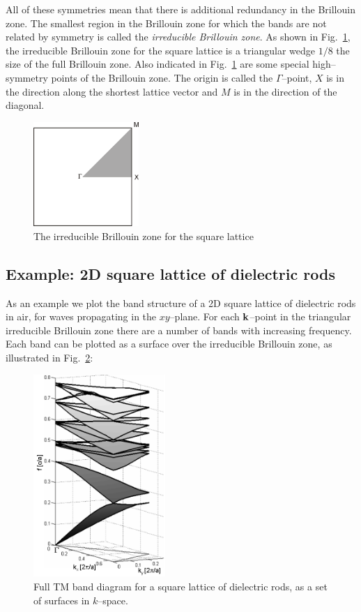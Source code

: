 All of these symmetries mean that there is additional redundancy in the Brillouin zone. The smallest region in the Brillouin zone for which the bands are not related by symmetry is called the \emph{irreducible Brillouin zone}. As shown in Fig.~\ref{fig-irred-bril}, the irreducible Brillouin zone for the square lattice is a triangular wedge $1/8$ the size of the full Brillouin zone. Also indicated in Fig.~\ref{fig-irred-bril} are some special high--symmetry points of the Brillouin zone. The origin is called the $\Gamma$--point, $X$ is in the direction along the shortest lattice vector and $M$ is in the direction of the diagonal. 

\begin{figure}
\centering
\includegraphics[width=4cm]{periodic/figures/irred_bril}
\caption{The irreducible Brillouin zone for the square lattice}
\label{fig-irred-bril}
\end{figure}

\subsection{Example: 2D square lattice of dielectric rods}

As an example we plot the band structure of a 2D square lattice of dielectric rods in air, for waves propagating in the $xy$--plane. For each ${\bf k}$--point in the triangular irreducible Brillouin zone there are a number of bands with increasing frequency. Each band can be plotted as a surface over the irreducible Brillouin zone, as illustrated in Fig.~\ref{fig-bands-rods-3D}:

\begin{figure}
\centering
\includegraphics[width=5cm]{periodic/figures/3d_bands}
\caption{Full TM band diagram for a square lattice of dielectric rods, as a set of surfaces in $k$--space.}
\label{fig-bands-rods-3D}
\end{figure}

